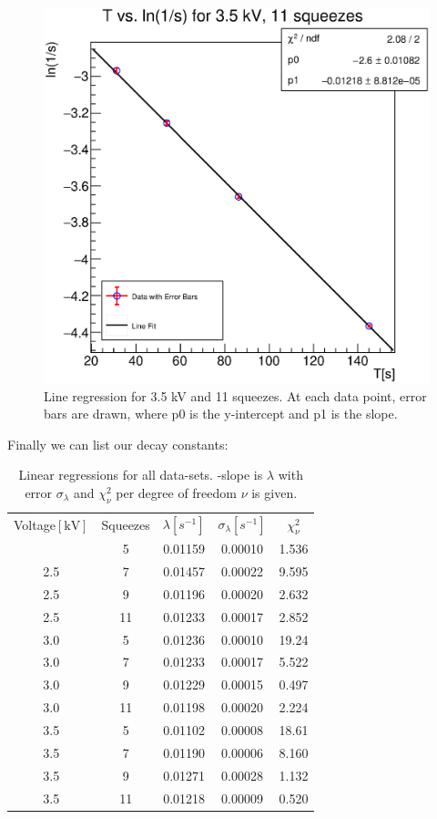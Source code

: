 \documentclass[reprint,amsmath,aps,nofootinbib,english]{revtex4-2}
\begin{document}
\begin{figure}[H]
  \includegraphics[width=0.95\columnwidth]{graphics/35_11.eps}
  \caption{Line regression for 3.5 kV and 11 squeezes. At each data point, error bars are drawn, where p0 is the y-intercept and p1 is the slope.}
\end{figure}
\newpage
Finally we can list our decay constants:
\begin{table}[H]
\caption{\label{tab:dc}%
Linear regressions for all data-sets. -slope is $\lambda$ with error $\sigma_\lambda$ and $\chi_\nu^2$ per degree of freedom $\nu$ is given.
}
\begin{ruledtabular}
\begin{tabular}{ccccc}
\textrm{Voltage$[\si{\kilo\volt}]$}&
\textrm{Squeezes}&
\textrm{$\lambda[s^{-1}]$}&
\textrm{$\sigma_\lambda[s^{-1}]$} &
\textrm{$\chi_\nu^2$} \\
\colrule  
2.5 & 5 & 0.01159 & 0.00010 & 1.536 \\
2.5 & 7 & 0.01457 & 0.00022 & 9.595 \\
2.5 & 9 & 0.01196 & 0.00020 & 2.632 \\
2.5 & 11 & 0.01233 & 0.00017 & 2.852 \\
\hline 
3.0 & 5 & 0.01236 & 0.00010 & 19.24 \\
3.0 & 7 & 0.01233 & 0.00017 & 5.522 \\
3.0 & 9 & 0.01229 & 0.00015 & 0.497 \\
3.0 & 11 & 0.01198 & 0.00020 & 2.224 \\
\hline 
3.5 & 5 & 0.01102 & 0.00008 & 18.61 \\
3.5 & 7 & 0.01190 & 0.00006 & 8.160 \\
3.5 & 9 & 0.01271 & 0.00028 & 1.132 \\
3.5 & 11 & 0.01218 & 0.00009 & 0.520 
\end{tabular}  
\end{ruledtabular}
\end{table}
\end{document}
